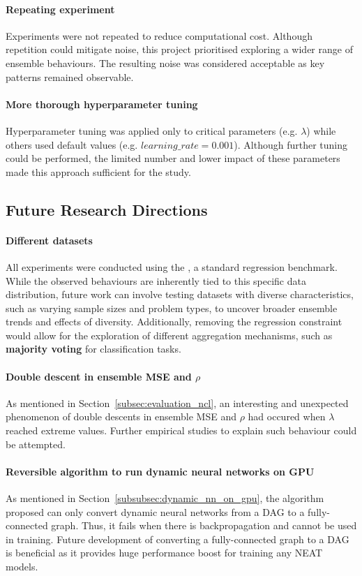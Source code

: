 \paragraph{Repeating experiment}
Experiments were not repeated to reduce computational cost. Although repetition could mitigate noise, this project prioritised exploring a wider range of ensemble behaviours. The resulting noise was considered acceptable as key patterns remained observable. 

\paragraph{More thorough hyperparameter tuning}
Hyperparameter tuning was applied only to critical parameters (e.g. $\lambda$) while others used default values (e.g. $learning\_rate = 0.001$). Although further tuning could be performed, the limited number and lower impact of these parameters made this approach sufficient for the study. 


\subsection{Future Research Directions}
\paragraph{Different datasets}
All experiments were conducted using the , a standard regression benchmark. While the observed behaviours are inherently tied to this specific data distribution, future work can involve testing datasets with diverse characteristics, such as varying sample sizes and problem types, to uncover broader ensemble trends and effects of diversity. Additionally, removing the regression constraint would allow for the exploration of different aggregation mechanisms, such as \textbf{majority voting} for classification tasks. 

\paragraph{Double descent in ensemble MSE and $\rho$}
As mentioned in Section~\ref{subsec:evaluation_ncl}, an interesting and unexpected phenomenon of double descents in ensemble MSE and $\rho$ had occured when $\lambda$ reached extreme values. Further empirical studies to explain such behaviour could be attempted. 

\paragraph{Reversible algorithm to run dynamic neural networks on GPU}
As mentioned in Section~\ref{subsubsec:dynamic_nn_on_gpu}, the algorithm proposed can only convert dynamic neural networks from a DAG to a fully-connected graph. Thus, it fails when there is backpropagation and cannot be used in training. Future development of converting a fully-connected graph to a DAG is beneficial as it provides huge performance boost for training any NEAT models. 

